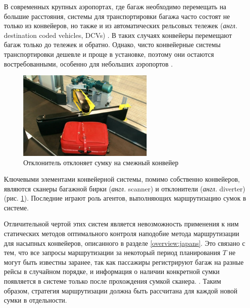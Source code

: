\documentclass[specification,annotation,times]{itmo-student-thesis}
\theoremstyle{definition}
\begin{document}
В современных крупных аэропортах, где багаж необходимо перемещать на большие
расстояния, системы для транспортировки багажа часто состоят не только из
конвейеров, но также и из автоматических рельсовых тележек (\textit{англ.}
destination coded vehicles, DCVs) \cite{fay2005decentralized, tarau2010model}.
В таких случаях конвейеры перемещают багаж только до тележек и обратно. Однако,
чисто конвейерные системы транспортировки дешевле и проще в установке, поэтому
они остаются востребованными, особенно для небольших аэропортов
\cite{vickers1998passenger}.

\begin{figure}[!h]
  \caption{Отклонитель отклоняет сумку на смежный конвейер}\label{diverter-pic}
  \centering
  \includegraphics[width=0.6\textwidth]{diverter-photo}
\end{figure}

Ключевыми элементами конвейерной системы, помимо собственно конвейеров, являются
сканеры багажной бирки (\textit{англ.} scanner) и отклонители (\textit{англ.}
diverter) (рис. \ref{diverter-pic}). Последние играют роль агентов, выполняющих
маршрутизацию сумок в системе.

Отличительной чертой этих систем является невозможность применения к ним
статических методов оптимального контроля наподобие метода маршрутизации для
насыпных конвейеров, описанного в разделе \ref{overview:japans}. Это связано с
тем, что все запросы маршрутизации за некоторый период планирования $T$ не могут
быть известны заранее, так как
пассажиры регистрируют багаж на разные рейсы в случайном порядке, и информация о
наличии конкретной сумки появляется в системе только после прохождения сумкой
сканера. \cite{hallenborg2007decentralized, de1994baggage}. Таким образом,
стратегия маршрутизации должна быть рассчитана для каждой новой сумки в
отдельности.
\end{document}
